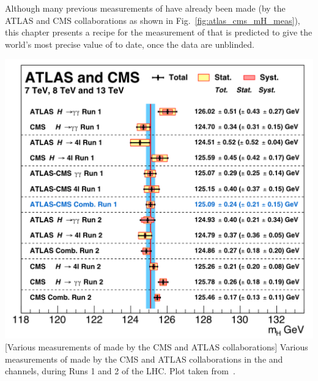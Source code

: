Although many previous measurements of \mH have already been made (\eg by the ATLAS and CMS collaborations as shown in Fig.~\ref{fig:atlas_cms_mH_meas}), this chapter presents a recipe for the measurement of \mH that is predicted to give the world's most precise value of \mH to date, once the data are unblinded.
\begin{multiFigure}
    \centering
    \includegraphics[width=\textwidth,keepaspectratio]{figures/higgsmassmeas/all_mH_measurements_atlas_cms.png}
        [Various measurements of \mH made by the CMS and ATLAS collaborations]
        {Various measurements of \mH made by the CMS and ATLAS collaborations in the \htoyy and \hzzfourl channels, during Runs 1 and 2 of the LHC.
        Plot taken from~\cite{particle_data_group_review_2020}.}
    \label{fig:atlas_cms_mH_meas}
\end{multiFigure}
